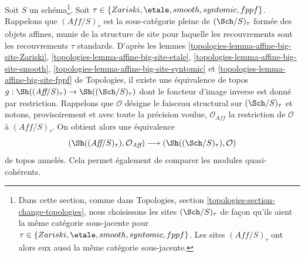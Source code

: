 \noindent
Soit $S$ un schéma\footnote{Dans cette section, comme dans Topologies,
section \ref{topologies-section-change-topologies}, nous choisissons les sites
$(\Sch/S)_\tau$ de façon qu'ils aient la même catégorie sous-jacente pour
$\tau \in \{Zariski, \etale, smooth, syntomic, fppf\}$. Les sites
$(\textit{Aff}/S)_\tau$ ont alors eux aussi la même catégorie sous-jacente.}.
Soit $\tau \in \{Zariski, \etale, smooth, syntomic, fppf\}$.
Rappelons que $(\textit{Aff}/S)_\tau$ est la sous-catégorie pleine de
$(\Sch/S)_\tau$ formée des objets affines, munie de la structure de site
pour laquelle les recouvrements sont les recouvrements $\tau$ standards.
D'après les lemmes
\ref{topologies-lemma-affine-big-site-Zariski},
\ref{topologies-lemma-affine-big-site-etale},
\ref{topologies-lemma-affine-big-site-smooth},
\ref{topologies-lemma-affine-big-site-syntomic} et
\ref{topologies-lemma-affine-big-site-fppf} de Topologies, il existe une équivalence de
topos
$g : \Sh((\textit{Aff}/S)_\tau) \to \Sh((\Sch/S)_\tau)$
dont le foncteur d'image inverse est donné par restriction.
Rappelons que $\mathcal{O}$ désigne le faisceau structural sur
$(\Sch/S)_\tau$ et notons, provisoirement et avec toute la précision voulue,
$\mathcal{O}_{\textit{Aff}}$ la restriction de $\mathcal{O}$ à
$(\textit{Aff}/S)_\tau$. On obtient alors une équivalence
\begin{equation}
\label{equation-alternative-ringed}
(\Sh((\textit{Aff}/S)_\tau), \mathcal{O}_{\textit{Aff}})
\longrightarrow
(\Sh((\Sch/S)_\tau), \mathcal{O})
\end{equation}
de topos annelés. Cela permet également de comparer les modules
quasi-cohérents.

